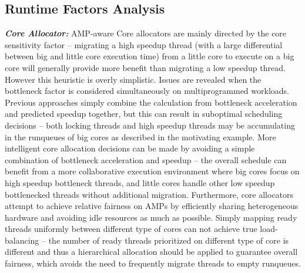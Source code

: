 \subsection{Runtime Factors Analysis}
\textbf{\textit{Core Allocator:}}
AMP-aware Core allocators are mainly directed by the core sensitivity factor -- migrating a high speedup thread (with a large differential between big and little core execution time) from  a little core to execute on a big core will generally provide more benefit than migrating a low speedup thread. 
However this heuristic is overly simplistic. Issues are revealed when the bottleneck factor is considered simultaneously on multiprogrammed workloads. Previous approaches \cite{jibaja2016portable} simply combine the calculation from  bottleneck acceleration and predicted speedup together, but this can result in suboptimal scheduling decisions -- both locking threads and high speedup threads may be accumulating in the runqueues of big cores as described in the motivating example. More intelligent core allocation decisions can be made by avoiding a simple combination of bottleneck acceleration and speedup -- the overall schedule can benefit from a more collaborative execution environment where big cores focus on high speedup bottleneck threads, and little cores handle other low speedup bottlenecked threads without additional migration.
Furthermore, core allocators attempt to achieve relative fairness on AMPs by efficiently sharing heterogeneous hardware and avoiding idle resources as much as possible. 
Simply mapping ready threads uniformly between different type of cores can not achieve true load-balancing -- the number of ready threads prioritized on different type of core is different and thus a hierarchical allocation should be applied to guarantee overall fairness, which avoids the need to frequently migrate threads to empty runqueues. 

